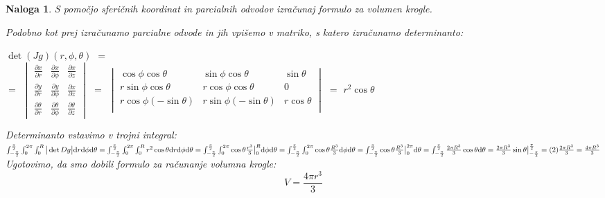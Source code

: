 \documentclass[12pt, a4paper]{article}
\newtheorem{naloga}{Naloga}
\begin{document}
\begin{naloga}
S pomočjo sferičnih koordinat in parcialnih odvodov izračunaj formulo za volumen krogle.

\emph{Podobno kot prej izračunamo parcialne odvode in jih vpišemo v matriko, s katero izračunamo determinanto:}
\\
\begin{center}
$ \det (Jg)(r,\phi, \theta)$ $=$  \\ $=$ \large  $\begin{vmatrix} \frac{\partial x}{\partial r}  &  \frac{\partial x}{\partial \phi} &  \frac{\partial x}{\partial z} \\  \frac{\partial y}{\partial r}  &  \frac{\partial y}{\partial \phi} &  \frac{\partial x}{\partial z} \\ \frac{\partial \theta}{\partial r}  &  \frac{\partial \theta}{\partial \phi} &  \frac{\partial \theta}{\partial z} \end{vmatrix} $ 
$=$  \normalsize $ \begin{vmatrix} \cos \phi  \cos \theta & \sin \phi  \cos \theta & \sin \theta \\ r \sin \phi  \cos \theta  & r \cos \phi  \cos \theta  & 0 \\ r \cos \phi  (-\sin \theta)  & r \sin \phi  (-\sin \theta)  & r \cos \theta \\ \end{vmatrix} $  $=$ $r^2 \cos \theta $
\end{center}

\emph{Determinanto vstavimo v trojni integral:} \\

$ \int^{\frac {\pi}{2}}_{- \frac {\pi}{2}} \int^{2\pi}_{0} \int^{R}_{0}  \big | \det Dg \big | \mathrm{d} r \mathrm{d}\phi \mathrm{d}\theta  \\
 =  \int^{\frac {\pi}{2}}_{- \frac {\pi}{2}} \int^{2\pi}_{0} \int^{R}_{0}   r^2 \cos \theta   \mathrm{d} r \mathrm{d}\phi \mathrm{d}\theta  \\
 =  \int^{\frac {\pi}{2}}_{- \frac {\pi}{2}} \int^{2\pi}_{0} \cos \theta \frac {r^3}{3} \big |^{R}_{0} \mathrm{d}\phi \mathrm{d}\theta  \\
 =  \int^{\frac {\pi}{2}}_{- \frac {\pi}{2}} \int^{2\pi}_{0} \cos \theta \frac {R^3}{3} \mathrm{d}\phi \mathrm{d}\theta  \\
 =  \int^{\frac {\pi}{2}}_{- \frac {\pi}{2}} \cos \theta \frac {R^3}{3} \big |^{2 \pi}_{0} \mathrm{d} \theta  \\
 =  \int^{\frac {\pi}{2}}_{- \frac {\pi}{2}} \frac {2 \pi R^3}{3} \cos \theta \mathrm{d} \theta  \\
 =  \frac {2 \pi R^3}{3} \sin \theta \big |^{\frac {\pi}{2}}_{-\frac {\pi}{2}}  \\
 =  (2) \frac {2 \pi R^3}{3}  \\
 =  \frac {4 \pi R^3}{3} $ \\

\emph
{Ugotovimo, da smo dobili formulo za računanje volumna krogle:}
$$
V=\frac{4\pi r^3}{3}
$$
\end{naloga}








\end{document}
